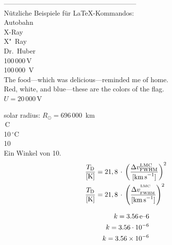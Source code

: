 -----------------------------------------------------------\\
N\"utzliche Beispiele f\"ur LaTeX-Kommandos:\\
Autob\-ahn\\	%
X-Ray\\		%
X"~Ray\\	%
Dr.~Huber\\	%
100\,000\,V\\	%
100\,000~V\\	%
The food---which was delicious---reminded me of home.\\
Red, white, and blue---these are the colors of the flag.\\

$U = 20$\,$000$\,V	%

solar radius: $R_\odot = 696\,000$~km\\




\,\textdegree{}C\\
10\,$^\circ$C\\			%
10\,\textcelsius\\
Ein Winkel von 10\textdegree.\\

\begin{align}
	\frac{T_\text{D}}{[\text{K}]} &= 21,8\,\cdot\,\left( \frac{\Delta v_\text{FWHM}^\text{LMC}}{[\text{km\,s}^{-1}]} \right)^2\\
	\frac{T_\text{D}}{[\text{K}]} &= 21,8\,\cdot\,\left( \frac{\Delta v_{{}_\text{FWHM}}^{{}^\text{LMC}}}{[\text{km\,s}^{-1}]} \right)^2
\end{align}

\begin{align}
	k = 3.56 \text{\,e--6}\\
	k = 3.56 \cdot 10^{-6}\\
	k = 3.56 \times 10^{-6}
\end{align}

